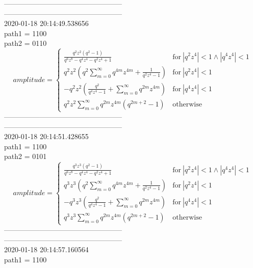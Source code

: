 --------------------------------------------------\\
--------------------------------------------------\\
2020-01-18 20:14:49.538656\\
path1 = 1100\\
path2 = 0110\\
$$amplitude = \begin{cases} \frac{q^{2} z^{2} \left(q^{2} - 1\right)}{q^{6} z^{8} - q^{4} z^{4} - q^{2} z^{4} + 1} & \text{for}\: \left|{q^{2} z^{4}}\right| < 1 \wedge \left|{q^{4} z^{4}}\right| < 1 \\q^{2} z^{2} \left(q^{2} \sum_{m=0}^{\infty} q^{4 m} z^{4 m} + \frac{1}{q^{2} z^{4} - 1}\right) & \text{for}\: \left|{q^{2} z^{4}}\right| < 1 \\- q^{2} z^{2} \left(\frac{q^{2}}{q^{4} z^{4} - 1} + \sum_{m=0}^{\infty} q^{2 m} z^{4 m}\right) & \text{for}\: \left|{q^{4} z^{4}}\right| < 1 \\q^{2} z^{2} \sum_{m=0}^{\infty} q^{2 m} z^{4 m} \left(q^{2 m + 2} - 1\right) & \text{otherwise} \end{cases}$$
--------------------------------------------------\\
--------------------------------------------------\\
2020-01-18 20:14:51.428655\\
path1 = 1100\\
path2 = 0101\\
$$amplitude = \begin{cases} \frac{q^{3} z^{3} \left(q^{2} - 1\right)}{q^{6} z^{8} - q^{4} z^{4} - q^{2} z^{4} + 1} & \text{for}\: \left|{q^{2} z^{4}}\right| < 1 \wedge \left|{q^{4} z^{4}}\right| < 1 \\q^{3} z^{3} \left(q^{2} \sum_{m=0}^{\infty} q^{4 m} z^{4 m} + \frac{1}{q^{2} z^{4} - 1}\right) & \text{for}\: \left|{q^{2} z^{4}}\right| < 1 \\- q^{3} z^{3} \left(\frac{q^{2}}{q^{4} z^{4} - 1} + \sum_{m=0}^{\infty} q^{2 m} z^{4 m}\right) & \text{for}\: \left|{q^{4} z^{4}}\right| < 1 \\q^{3} z^{3} \sum_{m=0}^{\infty} q^{2 m} z^{4 m} \left(q^{2 m + 2} - 1\right) & \text{otherwise} \end{cases}$$
--------------------------------------------------\\
--------------------------------------------------\\
2020-01-18 20:14:57.160564\\
path1 = 1100\\
